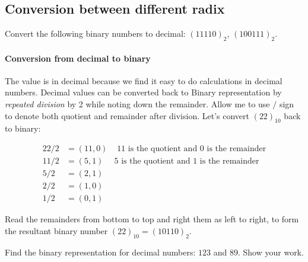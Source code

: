\vspace{15em}
\begin{comment}
Numbers with base $2$ are called binary numbers. For example, the number
$(10110)_2$ has value:
\begin{align*}
  (10110)_2 &= 1 \times 2^4+ 0 \times 2^3 + 1\times 2^2 + 1 \times 2^1+ 0\times 2^0
              \\
            &= 22.
\end{align*}
\end{comment}

\subsection{Conversion between different radix}
\begin{prob}
  Convert the following binary numbers to decimal: $(11110)_2$, $(100111)_2$.
\end{prob}
\vspace{10em}

\paragraph{Conversion from decimal to binary}
The value is in decimal because we find it easy to do calculations in decimal
numbers. Decimal values can be converted back to Binary representation by
\emph{repeated division} by 2 while noting down the remainder. Allow me
to use $/$ sign to denote both quotient and remainder after division. Let's convert $(22)_{10}$
back to binary: 

\begin{align*}
  22 / 2 &= (11, 0) & \text{ 11 is the quotient and 0 is the remainder} \\
  11 / 2 &= (5, 1) & \text{5 is the quotient and 1 is the remainder}\\
  5 / 2 &= (2, 1) & \\ 
  2 / 2 &= (1, 0) & \\
  1 / 2 &= (0, 1) &
\end{align*}

Read the remainders from bottom to top and right them as left to right, to form the resultant binary number $(22)_{10} = (10110)_2$.

\begin{prob}
Find the binary representation for decimal numbers: $123$ and $89$. Show your work.
\end{prob}
\vspace{10em}


